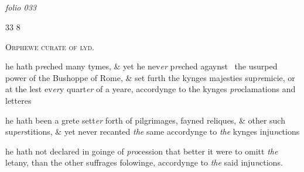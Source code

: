 \documentclass[12pt, a4paper]{book}
\begin{document}
            
\dotfill
						\newpage {} \subsection*{}  \subsection*{}  \subsection*{}

\textit{folio 033}


\begin{flushright}{\color{Mahogany}33} 8\end{flushright}
 

	
				\begin{center} \begin{large} {\scshape Orphewe curate of lyd.} \end{large} \end{center}
			


				\marginpar[\vspace{0.5cm}{\textcolor{Gray}{the bisshope of Rome}}]{}
			
		\ifthenelse{\isodd{\thepage}}
		{\reversemarginpar}
		{\normalmarginpar}
		he hath p\textit{re}ched many tymes, \& yet he nev\textit{er} p\textit{re}ched agaynst 
 the usurped power of the Bushoppe of Rome, \& set
 furth the kynges majesties sup\textit{re}micie, or at the lest ev\textit{er}y
 quart\textit{er }of a yeare, accordynge to the kynges \textit{pro}clamations
 and letteres

	
				\marginpar[\vspace{0.5cm}{\textcolor{Gray}{pilgrimages}}]{}
			
	
		\ifthenelse{\isodd{\thepage}}
		{\reversemarginpar}
		{\normalmarginpar}
		he hath been a grete sett\textit{er} forth of pilgrimages, fayned
 reliques, \& other such su\textit{pers}titions, \& yet never recanted \textit{the} same accordynge to \textit{the} kynges inju\textit{n}ctions

	
		\ifthenelse{\isodd{\thepage}}
		{\reversemarginpar}
		{\normalmarginpar}
		he hath not declared in goinge of \textit{pro}cession that better it
 were to omitt \textit{the} letany, than the other suffrages
 folowinge, accordynge to \textit{the} said inju\textit{n}ctions.
\end{document}
